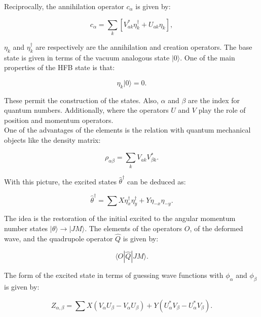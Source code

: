 \documentclass[openany]{book}
\begin{document}
Reciprocally, the annihilation operator $c_\alpha$ is given by: 


\begin{equation}\label{eq:micro_HFB_annihilation}
	c_\alpha = \sum_{k} [V^{*}_{ak} \eta^{\dagger}_k + U_{ak} \eta_k],
\end{equation}

$\eta_k$ and  $\eta^{\dagger}_k $ are respectively are the annihilation and creation operators.  The base state is given in terms of the vacuum analogous state $| 0 \rangle$. One of the main properties of the HFB state is that: 

\begin{equation}\label{eq:micro_HFB_base}
	\eta_k |0\rangle = 0.
\end{equation} 

These permit the construction of the states. Also, $\alpha$ and $\beta$ are the index for quantum numbers. Additionally, where the operators $U$ and $V$ play the role of position and momentum operators. \\

One of the advantages of the elements is the relation with quantum mechanical objects like the density matrix: 

\begin{equation}\label{eq:micro_HFB_densityMatrix}
	\rho_{\alpha \beta} = \sum_k {V_{ak}V^{*}_{\beta k}}.
\end{equation}

With this picture, the excited states ${\hat {\theta}}^{\dagger}$ can be deduced as:

\begin{equation}\label{eq:micro_QHFB_excited}
	{\hat {\theta}}^{\dagger} = \sum X \eta^\dagger_x \eta^\dagger_y   + Y \eta_{-x} \eta_{-y}.
\end{equation}

The idea is the restoration of the initial excited to the angular momentum number states $|\theta \rangle \rightarrow | JM \rangle$. The elements of the operators $O$, of the deformed wave, and the quadrupole operator $\hat Q$ is given by: 

\begin{equation}\label{eq:micro_QHFB_quadrupole}
	\langle  O | \hat Q|  JM \rangle. 
\end{equation}

The form of the excited state in terms of guessing wave functions with $\phi_\alpha$ and $\phi_\beta$ is given by:

\begin{equation}\label{eq:micro_QHFB_densityGround}
	Z_{\alpha, \beta} = \sum {X (V_\alpha U_\beta - V_\alpha U_\beta) + Y (U^{*}_\alpha V_\beta - U^{*}_\alpha V_\beta)}. 
\end{equation}
\end{document}
